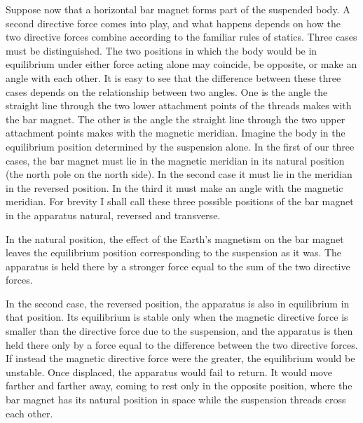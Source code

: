 Suppose now that a horizontal bar magnet forms part of the suspended body. A second directive force comes into play, and what happens depends on how the two directive forces combine according to the familiar rules of statics. Three cases must be distinguished. The two positions in which the body would be in equilibrium under either force acting alone may coincide, be opposite, or make an angle with each other. It is easy to see that the difference between these three cases depends on the relationship between two angles. One is the angle the straight line through the two lower attachment points of the threads makes with the bar magnet. The other is the angle the straight line through the two upper attachment points makes with the magnetic meridian. Imagine the body in the equilibrium position determined by the suspension alone. In the first of our three cases, the bar magnet must lie in the magnetic meridian in its natural position (the north pole on the north side). In the second case it must lie in the meridian in the reversed position. In the third it must make an angle with the magnetic meridian. For brevity I shall call these three possible positions of the bar magnet in the apparatus natural, reversed and transverse.

In the natural position, the effect of the Earth’s magnetism on the bar magnet leaves the equilibrium position corresponding to the suspension as it was. The apparatus is held there by a stronger force equal to the sum of the two directive forces.

In the second case, the reversed position, the apparatus is also in equilibrium in that position. Its equilibrium is stable only when the magnetic directive force is smaller than the directive force due to the suspension, and the apparatus is then held there only by a force equal to the difference between the two directive forces. If instead the magnetic directive force were the greater, the equilibrium would be unstable. Once displaced, the apparatus would fail to return. It would move farther and farther away, coming to rest only in the opposite position, where the bar magnet has its natural position in space while the suspension threads cross each other.

